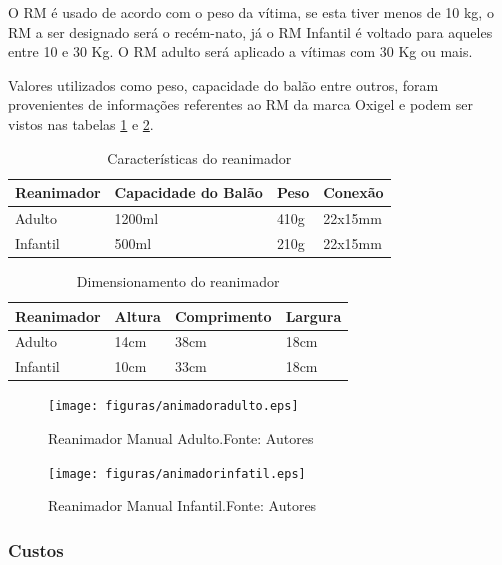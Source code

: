 O RM é usado de acordo com o peso da vítima, se esta tiver menos de 10 kg, o RM a ser designado será o recém-nato, já o RM Infantil é voltado para aqueles entre 10 e 30 Kg. O RM adulto será aplicado a vítimas com 30 Kg ou mais.

Valores utilizados como peso, capacidade do balão entre outros, foram provenientes de informações referentes ao RM da marca Oxigel e podem
ser vistos nas tabelas \ref{tab:caracteristicas} e \ref{tab:dimensionamento}.

\begin{table}[H]
\centering
	\caption{Características do reanimador}
\label{tab:caracteristicas}
\begin{tabular}{|l|l|l|l|}
\hline
\multicolumn{1}{|c|}{Reanimador} & Capacidade do Balão & Peso & Conexão \\ \hline
Adulto                           & 1200ml              & 410g & 22x15mm \\ \hline
Infantil                         & 500ml               & 210g & 22x15mm \\ \hline

\end{tabular}
\end{table}

\begin{table}[H]
\centering
	\caption{Dimensionamento do reanimador}
\label{tab:dimensionamento}
\begin{tabular}{|l|l|l|l|}
\hline
\multicolumn{1}{|c|}{Reanimador} & Altura & Comprimento & Largura \\ \hline
Adulto                           & 14cm   & 38cm        & 18cm    \\ \hline
Infantil                         & 10cm   & 33cm        & 18cm    \\ \hline
\end{tabular}
\end{table}


\vfill
\begin{figure}[H]
	\centering
	  \texttt{[image: figuras/animadoradulto.eps]}
	\caption{Reanimador Manual Adulto.Fonte: Autores}
	\label{fig:animadoradulto}
\end{figure}

\begin{figure}[H]
	\centering
	  \texttt{[image: figuras/animadorinfatil.eps]}
	\caption{ Reanimador Manual Infantil.Fonte: Autores}
	\label{fig:animadorinfatil}
\end{figure}

\subsubsection{Custos}

